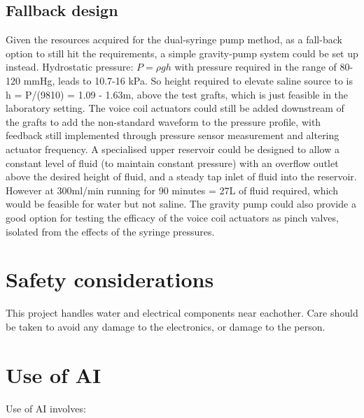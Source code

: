 \documentclass[10pt, a4paper]{article}
\begin{document}
\subsection{Fallback design}

Given the resources acquired for the dual-syringe pump method, as a fall-back option to still hit the requirements, a simple gravity-pump system could be set up instead. Hydrostatic pressure: $P= \rho gh$ with pressure required in the range of 80-120 mmHg, leads to 10.7-16 kPa. So height required to elevate saline source to is h = P/(9810) = 1.09 - 1.63m, above the test grafts, which is just feasible in the laboratory setting. The voice coil actuators could still be added downstream of the grafts to add the non-standard waveform to the pressure profile, with feedback still implemented through pressure sensor measurement and altering actuator frequency. A specialised upper reservoir could be designed to allow a constant level of fluid (to maintain constant pressure) with an overflow outlet above the desired height of fluid, and a steady tap inlet of fluid into the reservoir. However at 300ml/min running for 90 minutes = 27L of fluid required, which would be feasible for water but not saline. The gravity pump could also provide a good option for testing the efficacy of the voice coil actuators as pinch valves, isolated from the effects of the syringe pressures.

\section{Safety considerations}
This project handles water and electrical components near eachother. Care should be taken to avoid any damage to the electronics, or damage to the person.


\section{Use of AI}

Use of AI involves:
\end{document}

